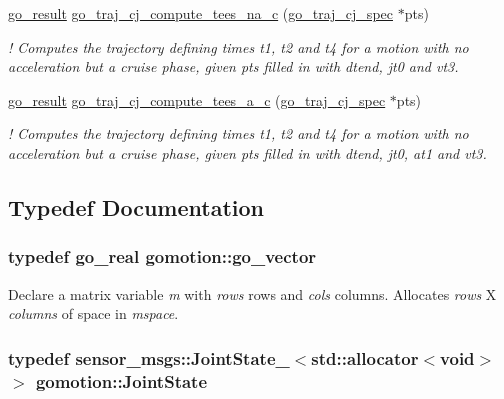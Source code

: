 \begin{DoxyCompactItemize}
\hyperlink{gotypes_8h_a55d48b38cd959f63c7e8db8337a9792a}{go\-\_\-result} \hyperlink{namespacegomotion_ac06c11fdcb4ac07e6bd860c904644c52}{go\-\_\-traj\-\_\-cj\-\_\-compute\-\_\-tees\-\_\-na\-\_\-c} (\hyperlink{structgomotion_1_1go__traj__cj__spec}{go\-\_\-traj\-\_\-cj\-\_\-spec} $\ast$pts)
\begin{DoxyCompactList}\small\item\em ! Computes the trajectory defining times {\itshape t1}, {\itshape t2} and {\itshape t4} for a motion with no acceleration but a cruise phase, given {\itshape pts} filled in with {\itshape dtend}, {\itshape jt0} and {\itshape vt3}. \end{DoxyCompactList}\item 
\hyperlink{gotypes_8h_a55d48b38cd959f63c7e8db8337a9792a}{go\-\_\-result} \hyperlink{namespacegomotion_a474f6e7cd5710ecb20c7fe42d188ddc9}{go\-\_\-traj\-\_\-cj\-\_\-compute\-\_\-tees\-\_\-a\-\_\-c} (\hyperlink{structgomotion_1_1go__traj__cj__spec}{go\-\_\-traj\-\_\-cj\-\_\-spec} $\ast$pts)
\begin{DoxyCompactList}\small\item\em ! Computes the trajectory defining times {\itshape t1}, {\itshape t2} and {\itshape t4} for a motion with no acceleration but a cruise phase, given {\itshape pts} filled in with {\itshape dtend}, {\itshape jt0}, at1 and {\itshape vt3}. \end{DoxyCompactList}\end{DoxyCompactItemize}


\subsection{Typedef Documentation}
\hypertarget{namespacegomotion_a5739eac588a6a458ed9258bae0a3fc80}{
\subsubsection[{go\-\_\-vector}]{\setlength{\rightskip}{0pt plus 5cm}typedef {\bf go\-\_\-real} {\bf gomotion\-::go\-\_\-vector}}}\label{namespacegomotion_a5739eac588a6a458ed9258bae0a3fc80}
Declare a matrix variable {\itshape m} with {\itshape rows} rows and {\itshape cols} columns. Allocates {\itshape rows} X {\itshape columns} of space in {\itshape mspace}. \hypertarget{namespacegomotion_a7b9d543e8aa36dfc345c5c38df12d427}{
\subsubsection[{Joint\-State}]{\setlength{\rightskip}{0pt plus 5cm}typedef sensor\-\_\-msgs\-::\-Joint\-State\-\_\-$<$std\-::allocator$<$void$>$ $>$ {\bf gomotion\-::\-Joint\-State}}}\label{namespacegomotion_a7b9d543e8aa36dfc345c5c38df12d427}


